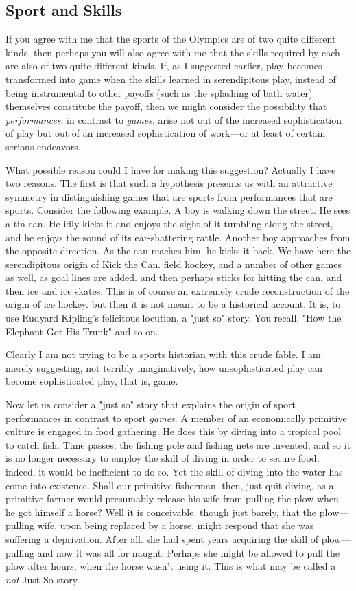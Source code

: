 \documentclass{tufte-handout}
\begin{document}
\subsection{Sport and Skills}

If you agree with me that the sports of the Olympics are of two quite different kinds, then perhaps you will also agree with me that the skills required by each are also of two quite different kinds. If, as I suggested earlier, play becomes transformed into game when the skills learned in serendipitous play, instead of being instrumental to other payoffs (such as the splashing of bath water) themselves constitute the payoff, then we might consider the possibility that \textit{performances}, in contrast to \textit{games}, arise not out of the increased sophistication of play but out of an increased sophistication of work---or at least of certain serious endeavors. 

What possible reason could I have for making this suggestion? Actually I have two reasons. The first is that such a hypothesis presents us with an attractive symmetry in distinguishing games that are sports from performances that are sports. Consider the following example. A boy is walking down the street. He sees a tin can. He idly kicks it and enjoys the sight of it tumbling along the street, and he enjoys the sound of its ear-shattering rattle. Another boy approaches from the opposite direction. As the can reaches him. he kicks it back. We have here the serendipitous origin of Kick the Can. field hockey, and a number of other games as well, as goal lines are added. and then perhaps sticks for hitting the can. and then ice and ice skates. This is of course an extremely crude reconstruction of the origin of ice hockey. but then it is not meant to be a historical account. It is, to use Rudyard Kipling’s felicitous locution, a "just so" story. You recall, "How the Elephant Got His Trunk" and so on.

Clearly I am not trying to be a sports historian with this crude fable. I am merely suggesting, not terribly imaginatively, how unsophisticated play can become sophisticated play, that is, game. 

Now let us consider a "just so" story that explains the origin of sport performances in contrast to sport \textit{games}. A member of an economically primitive culture is engaged in food gathering. He does this by diving into a tropical pool to catch fish. Time passes, the fishing pole and fishing nets are invented, and so it is no longer necessary to employ the skill of diving in order to secure food; indeed. it would be inefficient to do so. Yet the skill of diving into the water has come into existence. Shall our primitive fisherman. then, just quit diving, as a primitive farmer would presumably release his wife from pulling the plow when he got himself a horse? Well it is conceivable. though just barely, that the plow—pulling wife, upon being replaced by a horse, might respond that she was suffering a deprivation. After all. she had spent years acquiring the skill of plow—pulling and now it was all for naught. Perhaps she might be allowed to pull the plow after hours, when the horse wasn't using it. This is what may be called a \textit{not} Just So story. 
\end{document}
